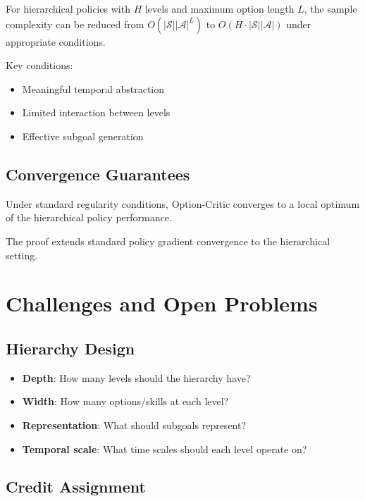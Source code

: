 \begin{theorem}
For hierarchical policies with $H$ levels and maximum option length $L$, the sample complexity can be reduced from $O(|\mathcal{S}||\mathcal{A}|^L)$ to $O(H \cdot |\mathcal{S}||\mathcal{A}|)$ under appropriate conditions.
\end{theorem}

Key conditions:
\begin{itemize}
    \item Meaningful temporal abstraction
    \item Limited interaction between levels
    \item Effective subgoal generation
\end{itemize}

\subsection{Convergence Guarantees}

\begin{theorem}
Under standard regularity conditions, Option-Critic converges to a local optimum of the hierarchical policy performance.
\end{theorem}

The proof extends standard policy gradient convergence to the hierarchical setting.

\section{Challenges and Open Problems}

\subsection{Hierarchy Design}

\begin{itemize}
    \item \textbf{Depth}: How many levels should the hierarchy have?
    \item \textbf{Width}: How many options/skills at each level?
    \item \textbf{Representation}: What should subgoals represent?
    \item \textbf{Temporal scale}: What time scales should each level operate on?
\end{itemize}

\subsection{Credit Assignment}

